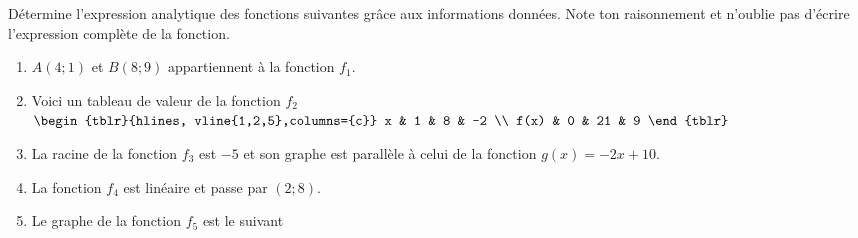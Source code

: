 %
%
    Détermine l'expression analytique des fonctions suivantes grâce aux informations données. Note ton raisonnement et n'oublie pas d'écrire l'expression complète de la fonction.
    \begin{enumerate}[itemsep=2em]
        \item
              $A(4;1)$ et $B(8;9)$ appartiennent à la fonction $f_1$.
        \item
              Voici un tableau de valeur de la fonction $f_2$
              \hfil
              $\begin{tblr}{hlines, vline{1,2,5},columns={c}}
                      x    & 1 & 8   & -2  \\
                      f(x) & 0 & 21 & 9
                  \end{tblr}$
        \item
              La racine de la fonction $f_3$ est $-5$ et son graphe est parallèle à celui de la fonction $g(x)=-2x + 10$.
        \item
              La fonction $f_4$ est linéaire et passe par $(2;8)$.
        \item
              Le graphe de la fonction $f_5$ est le suivant\hfil 
    \end{enumerate}

